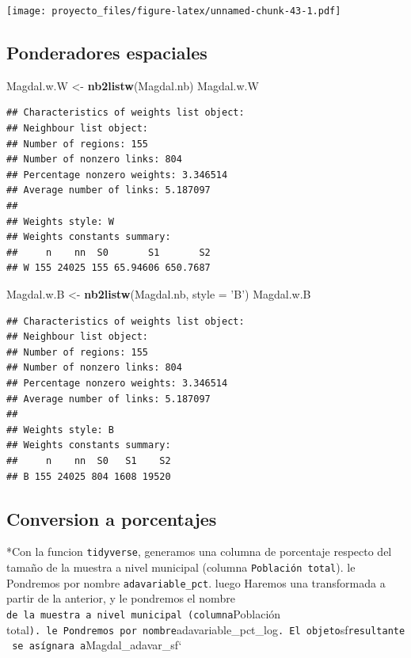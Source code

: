 \documentclass[11pt,]{article}
\newenvironment{Shaded}{\begin{snugshade}}{\end{snugshade}}
\newcommand{\KeywordTok}[1]{\textcolor[rgb]{0.13,0.29,0.53}{\textbf{#1}}}
\newcommand{\DataTypeTok}[1]{\textcolor[rgb]{0.13,0.29,0.53}{#1}}
\newcommand{\StringTok}[1]{\textcolor[rgb]{0.31,0.60,0.02}{#1}}
\newcommand{\NormalTok}[1]{#1}
\begin{document}
\texttt{[image: proyecto\_files/figure-latex/unnamed-chunk-43-1.pdf]}

\subsection{Ponderadores espaciales}\label{ponderadores-espaciales}

\begin{Shaded}
\begin{Highlighting}[]
\NormalTok{Magdal.w.W <-}\StringTok{ }\KeywordTok{nb2listw}\NormalTok{(Magdal.nb)}
\NormalTok{Magdal.w.W}
\end{Highlighting}
\end{Shaded}

\begin{verbatim}
## Characteristics of weights list object:
## Neighbour list object:
## Number of regions: 155 
## Number of nonzero links: 804 
## Percentage nonzero weights: 3.346514 
## Average number of links: 5.187097 
## 
## Weights style: W 
## Weights constants summary:
##     n    nn  S0       S1       S2
## W 155 24025 155 65.94606 650.7687
\end{verbatim}

\begin{Shaded}
\begin{Highlighting}[]
\NormalTok{Magdal.w.B <-}\StringTok{ }\KeywordTok{nb2listw}\NormalTok{(Magdal.nb, }\DataTypeTok{style =} \StringTok{'B'}\NormalTok{)}
\NormalTok{Magdal.w.B}
\end{Highlighting}
\end{Shaded}

\begin{verbatim}
## Characteristics of weights list object:
## Neighbour list object:
## Number of regions: 155 
## Number of nonzero links: 804 
## Percentage nonzero weights: 3.346514 
## Average number of links: 5.187097 
## 
## Weights style: B 
## Weights constants summary:
##     n    nn  S0   S1    S2
## B 155 24025 804 1608 19520
\end{verbatim}

\subsection{Conversion a porcentajes}\label{conversion-a-porcentajes}

*Con la funcion \texttt{tidyverse}, generamos una columna de porcentaje
respecto del tamaño de la muestra a nivel municipal (columna
\texttt{Población\ total}). le Pondremos por nombre
\texttt{adavariable\_pct}. luego Haremos una transformada a partir de la
anterior, y le pondremos el nombre
\texttt{de\ la\ muestra\ a\ nivel\ municipal\ (columna}Población
total\texttt{).\ le\ Pondremos\ por\ nombre}adavariable\_pct\_log\texttt{.\ El\ objeto}sf\texttt{resultante\ se\ asígnara\ a}Magdal\_adavar\_sf`
\end{document}

